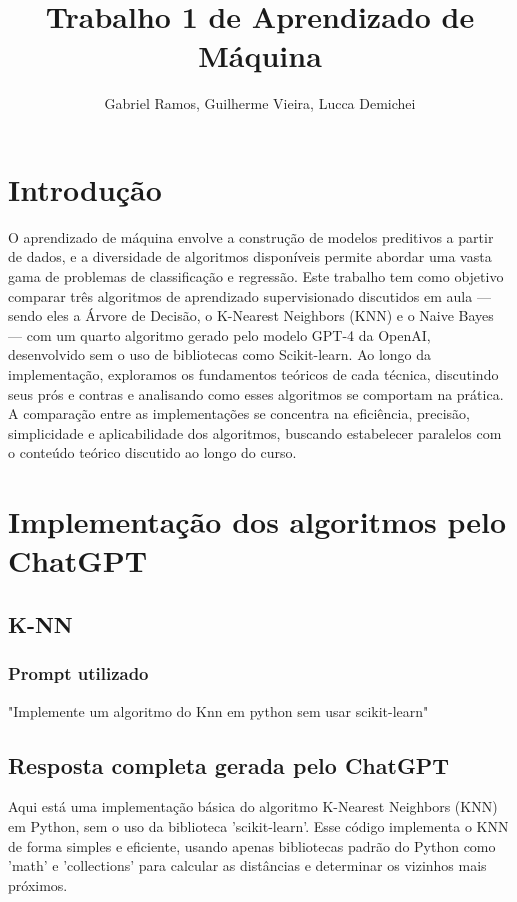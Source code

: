 \documentclass[12pt]{article}
\title{Trabalho 1 de Aprendizado de Máquina}
\author{Gabriel Ramos, Guilherme Vieira, Lucca Demichei\inst{1}}
\begin{document}
 
	\maketitle
 
\section{Introdução}

\label{sec:introducao}
 
O aprendizado de máquina envolve a construção de modelos preditivos a partir de dados, e a diversidade de algoritmos disponíveis permite abordar uma vasta gama de problemas de classificação e regressão. Este trabalho tem como objetivo comparar três algoritmos de aprendizado supervisionado discutidos em aula — sendo eles a Árvore de Decisão, o K-Nearest Neighbors (KNN) e o Naive Bayes — com um quarto algoritmo gerado pelo modelo GPT-4 da OpenAI, desenvolvido sem o uso de bibliotecas como Scikit-learn. Ao longo da implementação, exploramos os fundamentos teóricos de cada técnica, discutindo seus prós e contras e analisando como esses algoritmos se comportam na prática. A comparação entre as implementações se concentra na eficiência, precisão, simplicidade e aplicabilidade dos algoritmos, buscando estabelecer paralelos com o conteúdo teórico discutido ao longo do curso.



\section{Implementação dos algoritmos pelo ChatGPT}
\label{sec:implementacao}

\subsection{K-NN}
\subsubsection{Prompt utilizado}
"Implemente um algoritmo do Knn em python sem usar scikit-learn"

\subsection{Resposta completa gerada pelo ChatGPT}

Aqui está uma implementação básica do algoritmo K-Nearest Neighbors (KNN) em Python, sem o uso da biblioteca 'scikit-learn'. Esse código implementa o KNN de forma simples e eficiente, usando apenas bibliotecas padrão do Python como 'math' e 'collections' para calcular as distâncias e determinar os vizinhos mais próximos.
\end{document}
